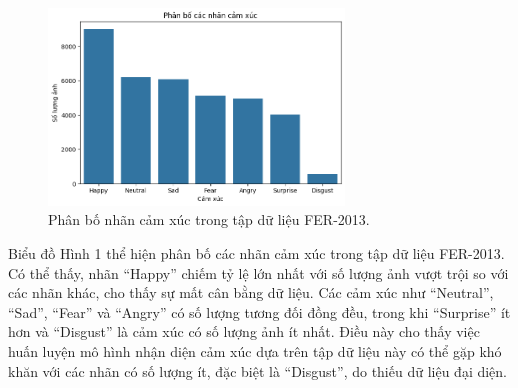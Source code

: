 \begin{figure}[H]
    \centering
    \includegraphics[width=0.7\textwidth]{img/phan_bo_nhan_cam_xuc.png} %
    \caption{Phân bố nhãn cảm xúc trong tập dữ liệu FER-2013.}
    \label{fig:emotion_distribution}
\end{figure}

Biểu đồ Hình 1 thể hiện phân bố các nhãn cảm xúc trong tập dữ liệu FER-2013. Có thể thấy, nhãn “Happy” chiếm tỷ lệ lớn nhất với số lượng ảnh vượt trội so với các nhãn khác, cho thấy sự mất cân bằng dữ liệu. Các cảm xúc như “Neutral”, “Sad”, “Fear” và “Angry” có số lượng tương đối đồng đều, trong khi “Surprise” ít hơn và “Disgust” là cảm xúc có số lượng ảnh ít nhất. Điều này cho thấy việc huấn luyện mô hình nhận diện cảm xúc dựa trên tập dữ liệu này có thể gặp khó khăn với các nhãn có số lượng ít, đặc biệt là “Disgust”, do thiếu dữ liệu đại diện.

